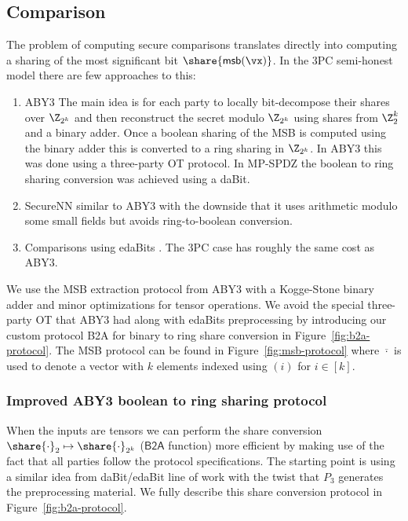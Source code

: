 \subsection{Comparison}


The problem of computing secure comparisons translates directly into computing a sharing of the most significant bit $\share{\mathsf{msb}(\vx)}$.
In the 3PC semi-honest model there are few approaches to this:
\begin{enumerate}
   \item ABY3 \cite{CCS:MohRin18} The main idea is for
   each party to locally bit-decompose their shares over $\Z_{2^k}$ and then
   reconstruct the secret modulo $\Z_{2^k}$ using shares from $\Z^k_2$ and a
   binary adder. Once a boolean sharing of the MSB is computed using the binary adder
   this is converted to a ring sharing in $\Z_{2^k}$.
   In ABY3 this was done using a three-party OT protocol. In MP-SPDZ \cite{CCS:Keller20}
   the boolean to ring sharing conversion was achieved using a daBit.
   \item SecureNN \cite{PoPETS:WagGupCha19}
   similar to ABY3 with the downside that it uses arithmetic modulo
   some small fields but avoids ring-to-boolean conversion.
  \item Comparisons using edaBits \cite{C:EGKRS20}. The 3PC case has roughly the same cost as ABY3.
\end{enumerate}

We use the MSB extraction protocol from ABY3 with a Kogge-Stone binary adder and minor optimizations for tensor operations. We avoid the special three-party OT that ABY3 had along with edaBits preprocessing by introducing our custom protocol \textsf{B2A} for binary to ring share conversion in Figure~\ref{fig:b2a-protocol}.
The MSB protocol can be found in Figure~\ref{fig:msb-protocol} where $\overline{\cdot}$ is used to denote a vector with $k$ elements indexed using $(i)$ for $i \in [k]$.




\subsubsection{Improved ABY3 boolean to ring sharing protocol}
When the inputs are tensors we can perform the share conversion $\share{\cdot}_2
\mapsto \share{\cdot}_{2^k}$ ($\mathsf{B2A}$ function)
more efficient by making use of the fact that all parties
follow the protocol specifications. The starting point is using a similar idea
from daBit/edaBit \cite{INDOCRYPT:RotWoo19,C:EGKRS20}
line of work with the twist that $P_3$ generates the preprocessing
material. We fully describe this share conversion protocol in Figure~\ref{fig:b2a-protocol}.

